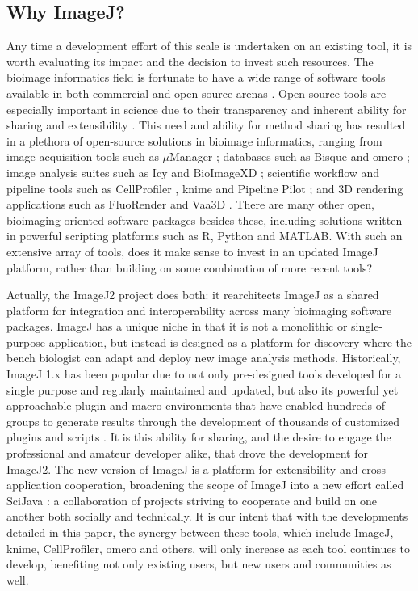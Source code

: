 \documentclass{bmcart}
\begin{document}
\subsection*{Why ImageJ?}
Any time a development effort of this scale is undertaken on an existing tool,
it is worth evaluating its impact and the decision to invest such resources.
The bioimage informatics field \cite{bioimage_informatics} is fortunate to have
a wide range of software tools available in both commercial and open source
arenas \cite{bioimaging_software_review}. Open-source tools are especially
important in science due to their transparency and inherent ability for sharing
and extensibility \cite{bioimaging_cell_biology}. This need and ability for
method sharing has resulted in a plethora of open-source solutions in bioimage
informatics, ranging from image acquisition tools such as $\mu$Manager
\cite{micro_manager_2010, micro_manager_2014}; databases such as Bisque
\cite{bisque} and \acrfull{omero} \cite{omero}; image analysis suites such as
Icy \cite{icy} and BioImageXD \cite{bioimagexd}; scientific workflow and
pipeline tools such as CellProfiler \cite{cellprofiler, cellprofiler_2011},
\acrshort{knime} \cite{knime, knip} and Pipeline Pilot \cite{workflow_systems};
and 3D rendering applications such as FluoRender \cite{fluorender} and Vaa3D
\cite{vaa3d}. There are many other open, bioimaging-oriented software packages
besides these, including solutions written in powerful scripting platforms such
as R, Python and MATLAB. With such an extensive array of tools, does it make
sense to invest in an updated ImageJ platform, rather than building on some
combination of more recent tools?

Actually, the ImageJ2 project does both: it rearchitects ImageJ as a shared
platform for integration and interoperability across many bioimaging software
packages. ImageJ has a unique niche in that it is not a monolithic or
single-purpose application, but instead is designed as a platform for discovery
where the bench biologist can adapt and deploy new image analysis methods.
Historically, ImageJ 1.x has been popular due to not only pre-designed tools
developed for a single purpose and regularly maintained and updated, but also
its powerful yet approachable plugin and macro environments that have enabled
hundreds of groups to generate results through the development of thousands of
customized plugins and scripts \cite{imagej_review, imagej_ecosystem,
imagej_list_of_update_sites}. It is this ability for sharing, and the desire to
engage the professional and amateur developer alike, that drove the development
for ImageJ2. The new version of ImageJ is a platform for extensibility and
cross-application cooperation, broadening the scope of ImageJ into a new effort
called SciJava \cite{scijava}: a collaboration of projects striving to
cooperate and build on one another both socially and technically. It is our
intent that with the developments detailed in this paper, the synergy between
these tools, which include ImageJ, \acrshort{knime}, CellProfiler,
\acrshort{omero} and others, will only increase as each tool continues to
develop, benefiting not only existing users, but new users and communities as
well.
\end{document}
